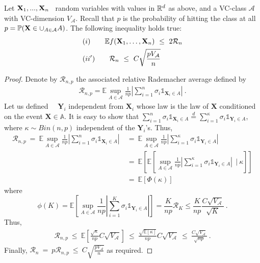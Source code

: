 \begin{lemma}
\label{back:lem-relative-rademacher}
Let $\mathbf X_1,...,\mathbf X_n$ \iid~random variables with values in $\mathbb{R}^d$ as above, and a VC-class $\mathcal{A}$ with VC-dimension $V_{\mathcal{A}}$. Recall that $p$ is the probability of hitting the class at all $p= \mathbb{P}(\mathbf X \in \cup_{A \in \mathcal{A}}A)$.
The following inequality holds true:
\begin{align*}
&(i)~~~~~~  \mathbb{E}f(\mathbf X_1,\ldots,\mathbf X_n) ~\le~ 2 \mathcal{R}_n\\
&(ii')~~~~~~ \mathcal{R}_n ~\le~ C \sqrt{\frac{p V_{\mathcal{A}}}{n}}
\end{align*}
\end{lemma}
\begin{proof}
Denote by $\mathcal{R}_{n,p}$ the associated relative Rademacher average defined by 
\begin{align*}
\mathcal{R}_{n,p} = \mathbb{E} \sup_{A \in \mathcal{A}} \frac{1}{np} \left | \sum_{i=1}^{n} \sigma_i \mathds{1}_{\mathbf{X}_i \in A}\right|~. 
\end{align*}
Let us defined \iid~\rv~$\mathbf{Y}_i$ independent from $\mathbf{X}_i$ whose law is the law of $\mathbf{X}$ conditioned on the event $\mathbf{X} \in \mathbb{A}$. It is easy to show that
$\sum_{i=1}^n \sigma_i \mathds{1}_{\mathbf{X}_i \in A} \overset{d}{=} \sum_{i=1}^{\kappa} \sigma_i \mathds{1}_{\mathbf{Y}_i \in A}$, where $\kappa \sim Bin(n,p)$ independent of the $\mathbf{Y}_i$'s. %
Thus, 
\begin{align*}
\mathcal{R}_{n,p} ~=~ \mathbb{E} \sup_{A \in \mathcal{A}} \frac{1}{np} \left | \sum_{i=1}^{n} \sigma_i \mathds{1}_{\mathbf{X}_i \in A}\right| &~=~ \mathbb{E} \sup_{A \in \mathcal{A}} \frac{1}{np} \left | \sum_{i=1}^{\kappa} \sigma_i \mathds{1}_{\mathbf{Y}_i \in A}\right| \\
&~=~ \mathbb{E} \left[\mathbb{E} \left[\sup_{A \in \mathcal{A}} \frac{1}{np} \left | \sum_{i=1}^{\kappa} \sigma_i \mathds{1}_{\mathbf{Y}_i \in A} \right|~~|~\kappa \right] \right]\\
&~=~\mathbb{E}\left [ \Phi(\kappa)\right]
\end{align*}
where $$\phi(K) = \mathbb{E} \left[\sup_{A \in \mathcal{A}} \frac{1}{np} \left | \sum_{i=1}^{K} \sigma_i \mathds{1}_{\mathbf{Y}_i \in A} \right|\right] = \frac{K}{np} \mathcal{R}_K \le \frac{K}{np} \frac{C \sqrt{V_{\mathcal{A}}}}{\sqrt K}~.$$
Thus,
\begin{align*}
\mathcal{R}_{n,p} ~\le~ \mathbb{E}\left [ \frac{\sqrt \kappa}{np} C\sqrt{V_{\mathcal{A}}}\right] ~\le~ \frac{\sqrt{\mathbb{E}[\kappa]}}{np} C\sqrt{V_{\mathcal{A}}} ~\le~ \frac{C\sqrt{V_{\mathcal{A}}}}{\sqrt{np}} ~.
\end{align*}
Finally, $\mathcal{R}_n  ~=~ p \mathcal{R}_{n,p}  ~\le~ C \sqrt{\frac{p V_{\mathcal{A}}}{n}}$ as required.
\end{proof}

